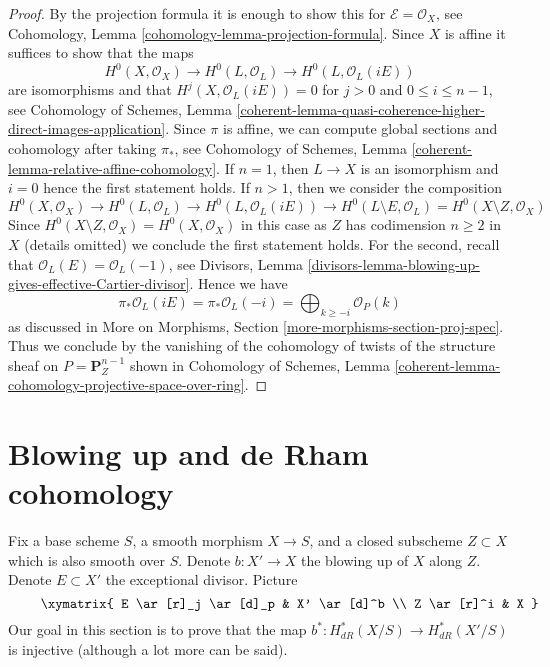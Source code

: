 \begin{proof}
By the projection formula it is enough to show this for
$\mathcal{E} = \mathcal{O}_X$, see Cohomology, Lemma
\ref{cohomology-lemma-projection-formula}.
Since $X$ is affine it suffices to show that the maps
$$
H^0(X, \mathcal{O}_X) \to
H^0(L, \mathcal{O}_L) \to
H^0(L, \mathcal{O}_L(iE))
$$
are isomorphisms and that $H^j(X, \mathcal{O}_L(iE)) = 0$
for $j > 0$ and $0 \leq i \leq n - 1$, see Cohomology of Schemes, Lemma
\ref{coherent-lemma-quasi-coherence-higher-direct-images-application}.
Since $\pi$ is affine, we can compute global sections and
cohomology after taking $\pi_*$, see Cohomology of Schemes, Lemma
\ref{coherent-lemma-relative-affine-cohomology}. If $n = 1$, then
$L \to X$ is an isomorphism and $i = 0$ hence the first statement holds.
If $n > 1$, then we consider the composition
$$
H^0(X, \mathcal{O}_X) \to H^0(L, \mathcal{O}_L) \to
H^0(L, \mathcal{O}_L(iE)) \to H^0(L \setminus E, \mathcal{O}_L) =
H^0(X \setminus Z, \mathcal{O}_X)
$$
Since
$H^0(X \setminus Z, \mathcal{O}_X) = H^0(X, \mathcal{O}_X)$ in this
case as $Z$ has codimension $n \geq 2$ in $X$ (details omitted) we conclude
the first statement holds. For the second, recall that
$\mathcal{O}_L(E) = \mathcal{O}_L(-1)$, see Divisors, Lemma
\ref{divisors-lemma-blowing-up-gives-effective-Cartier-divisor}.
Hence we have
$$
\pi_*\mathcal{O}_L(iE) =
\pi_*\mathcal{O}_L(-i) =
\bigoplus\nolimits_{k \geq -i} \mathcal{O}_P(k)
$$
as discussed in
More on Morphisms, Section \ref{more-morphisms-section-proj-spec}.
Thus we conclude by the vanishing of the cohomology of twists
of the structure sheaf on $P = \mathbf{P}^{n - 1}_Z$
shown in Cohomology of Schemes, Lemma
\ref{coherent-lemma-cohomology-projective-space-over-ring}.
\end{proof}























\section{Blowing up and de Rham cohomology}
\label{section-blowing-up}

\noindent
Fix a base scheme $S$, a smooth morphism $X \to S$, and a closed subscheme
$Z \subset X$ which is also smooth over $S$. Denote $b : X' \to X$
the blowing up of $X$ along $Z$. Denote $E \subset X'$ the exceptional
divisor. Picture
\begin{equation}
\label{equation-blowup}
\vcenter{
\xymatrix{
E \ar[r]_j \ar[d]_p & X' \ar[d]^b \\
Z \ar[r]^i & X
}
}
\end{equation}
Our goal in this section is to prove that the map
$b^* : H_{dR}^*(X/S) \longrightarrow H_{dR}^*(X'/S)$
is injective (although a lot more can be said).

